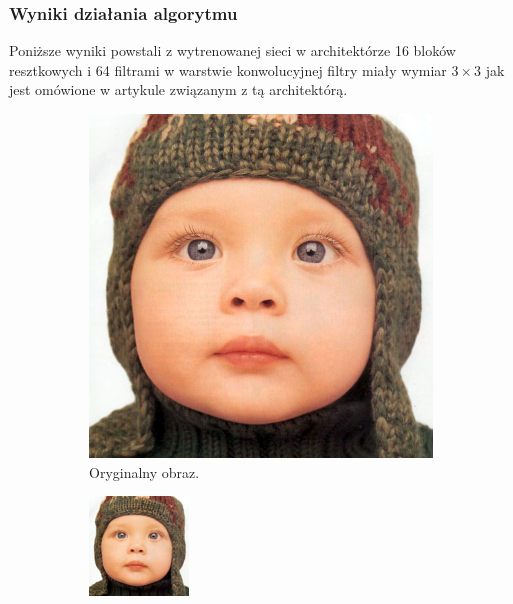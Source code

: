 \documentclass[a4paper,11pt, notitlepage ]{article}
\begin{document}
\newpage
 \subsubsection{Wyniki działania algorytmu}
 Poniższe wyniki powstali z wytrenowanej sieci w architektórze 16 bloków resztkowych i 64 filtrami w warstwie konwolucyjnej  filtry miały wymiar $3 \times 3$ jak jest omówione w artykule związanym z tą architektórą.
 	 \begin{figure}[h!]
 	\centering
 	\begin{subfigure}[b]{0.4\linewidth}
 		\includegraphics[width=\linewidth]{baby_GT.png}
 		\caption{Oryginalny obraz.}
 	\end{subfigure}
 	\begin{subfigure}[b]{0.4\linewidth}
 		\includegraphics[width=\linewidth]{EDSR/EDSR_INPUT.png}

\end{subfigure}
\end{figure}
\end{document}

